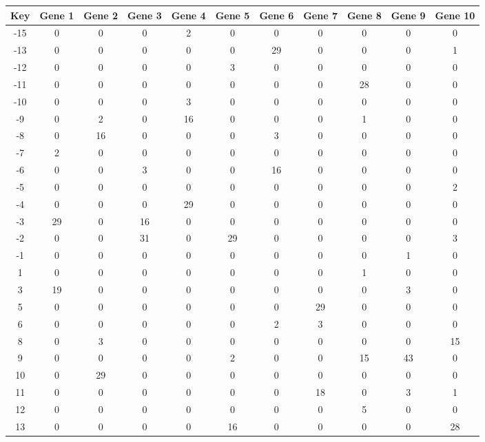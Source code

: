 \begin{tabular}{|c|c|c|c|c|c|c|c|c|c|c|}
\hline
Key & Gene 1 & Gene 2 & Gene 3 & Gene 4 & Gene 5 & Gene 6 & Gene 7 & Gene 8 & Gene 9 & Gene 10 \\
\hline
-15 & 0 & 0 & 0 & 2 & 0 & 0 & 0 & 0 & 0 & 0 \\
-13 & 0 & 0 & 0 & 0 & 0 & 29 & 0 & 0 & 0 & 1 \\
-12 & 0 & 0 & 0 & 0 & 3 & 0 & 0 & 0 & 0 & 0 \\
-11 & 0 & 0 & 0 & 0 & 0 & 0 & 0 & 28 & 0 & 0 \\
-10 & 0 & 0 & 0 & 3 & 0 & 0 & 0 & 0 & 0 & 0 \\
-9 & 0 & 2 & 0 & 16 & 0 & 0 & 0 & 1 & 0 & 0 \\
-8 & 0 & 16 & 0 & 0 & 0 & 3 & 0 & 0 & 0 & 0 \\
-7 & 2 & 0 & 0 & 0 & 0 & 0 & 0 & 0 & 0 & 0 \\
-6 & 0 & 0 & 3 & 0 & 0 & 16 & 0 & 0 & 0 & 0 \\
-5 & 0 & 0 & 0 & 0 & 0 & 0 & 0 & 0 & 0 & 2 \\
-4 & 0 & 0 & 0 & 29 & 0 & 0 & 0 & 0 & 0 & 0 \\
-3 & 29 & 0 & 16 & 0 & 0 & 0 & 0 & 0 & 0 & 0 \\
-2 & 0 & 0 & 31 & 0 & 29 & 0 & 0 & 0 & 0 & 3 \\
-1 & 0 & 0 & 0 & 0 & 0 & 0 & 0 & 0 & 1 & 0 \\
1 & 0 & 0 & 0 & 0 & 0 & 0 & 0 & 1 & 0 & 0 \\
3 & 19 & 0 & 0 & 0 & 0 & 0 & 0 & 0 & 3 & 0 \\
5 & 0 & 0 & 0 & 0 & 0 & 0 & 29 & 0 & 0 & 0 \\
6 & 0 & 0 & 0 & 0 & 0 & 2 & 3 & 0 & 0 & 0 \\
8 & 0 & 3 & 0 & 0 & 0 & 0 & 0 & 0 & 0 & 15 \\
9 & 0 & 0 & 0 & 0 & 2 & 0 & 0 & 15 & 43 & 0 \\
10 & 0 & 29 & 0 & 0 & 0 & 0 & 0 & 0 & 0 & 0 \\
11 & 0 & 0 & 0 & 0 & 0 & 0 & 18 & 0 & 3 & 1 \\
12 & 0 & 0 & 0 & 0 & 0 & 0 & 0 & 5 & 0 & 0 \\
13 & 0 & 0 & 0 & 0 & 16 & 0 & 0 & 0 & 0 & 28 \\
\hline
\end{tabular}